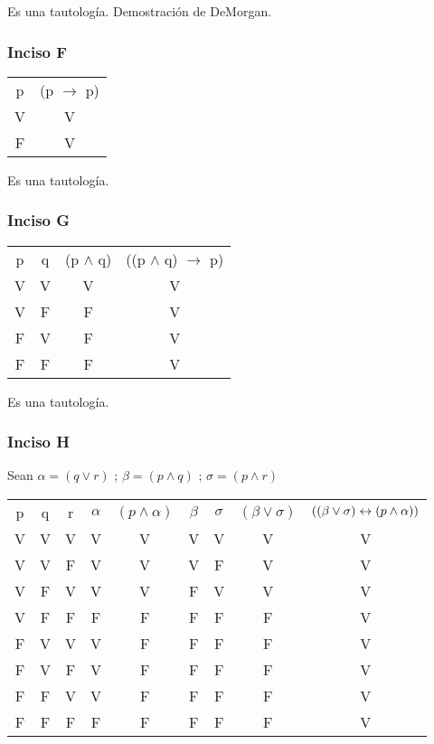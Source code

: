 Es una tautología. Demostración de DeMorgan.

\subsubsection{Inciso F}
\begin{tabular}{c|c}
    p & (p $\rightarrow$ p) \\
    V & V               \\
    F & V
\end{tabular}

Es una tautología.

\subsubsection{Inciso G}
\begin{tabular}{c|c|c|c}
        p & q & (p $\wedge$ q) & ((p $\wedge$ q) $\rightarrow$ p) \\
        V & V & V              & V \\
        V & F & F              & V \\
        F & V & F              & V \\
        F & F & F              & V
\end{tabular}

Es una tautología.

\subsubsection{Inciso H}

Sean $\alpha = (q\vee r)$ ; $\beta = (p \wedge q)$ ; $\sigma = (p \wedge r)$

\begin{tabular}{c|c|c|c|c|c|c|c|c}
    p & q & r & $\alpha$ & $(p \wedge \alpha)$ & $\beta$ & $\sigma$ & $(\beta \vee \sigma)$ & $((\beta \vee \sigma) \leftrightarrow (p \wedge \alpha))$\\
    V & V & V & V & V & V & V & V & V \\
    V & V & F & V & V & V & F & V & V \\
    V & F & V & V & V & F & V & V & V \\
    V & F & F & F & F & F & F & F & V \\
    F & V & V & V & F & F & F & F & V \\
    F & V & F & V & F & F & F & F & V \\
    F & F & V & V & F & F & F & F & V \\
    F & F & F & F & F & F & F & F & V
\end{tabular}

